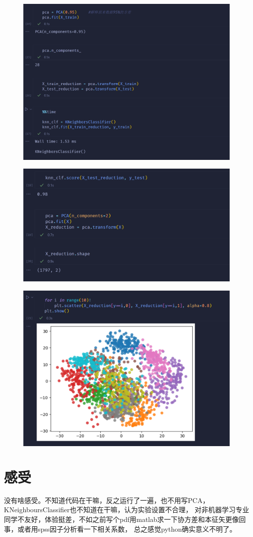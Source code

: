 \documentclass{article}
\begin{document}
\begin{figure}[H]
    \centering
    \includegraphics[width=\linewidth]{12.png}
\end{figure}
\begin{figure}[H]
    \centering
    \includegraphics[width=\linewidth]{13.png}
\end{figure}
\begin{figure}[H]
    \centering
    \includegraphics[width=\linewidth]{14.png}
\end{figure}

\section{感受}

没有啥感受。不知道代码在干嘛，反之运行了一遍，也不用写PCA，KNeighboursClassifier也不知道在干嘛，认为实验设置不合理，
对非机器学习专业同学不友好，体验挺差，不如之前写个pdf用matlab求一下协方差和本征矢更像回事，或者用spss因子分析看一下相关系数，
总之感觉python确实意义不明了。
\end{document}
